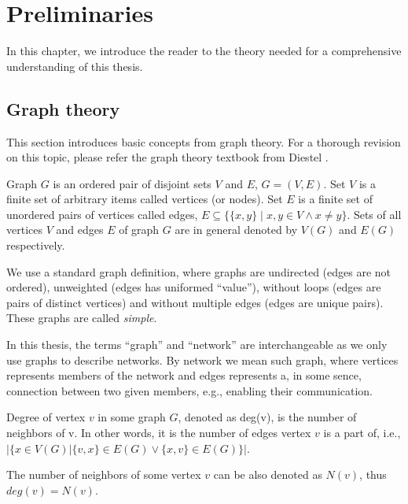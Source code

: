 \chapter{Preliminaries}

In this chapter, we introduce the reader to the theory needed for a comprehensive understanding of this thesis.


\section{Graph theory}

This section introduces basic concepts from graph theory.
For a thorough revision on this topic, please refer the graph theory textbook from Diestel \cite{Diestel2018}.

\begin{definition}[Graph]
    Graph $G$ is an ordered pair of disjoint sets $V$ and $E$, $G=(V,E)$.
    Set $V$ is a finite set of arbitrary items called vertices (or nodes).
    Set $E$ is a finite set of unordered pairs of vertices called edges, $E \subseteq \{\{x,y\} \mid x,y \in V \wedge x \neq y\}$.
    Sets of all vertices $V$ and edges $E$ of graph $G$ are in general denoted by $V(G)$ and $E(G)$ respectively.
\end{definition}
We use a standard graph definition, where graphs are undirected (edges are not ordered),
unweighted (edges has uniformed ``value''), without loops (edges are pairs of distinct vertices) and
without multiple edges (edges are unique pairs).
These graphs are called \emph{simple}.

In this thesis, the terms ``graph'' and ``network'' are interchangeable as we only use graphs to describe networks.
By network we mean such graph, where vertices represents members of the network 
and edges represents a, in some sence, connection between two given members, e.g., enabling their communication.

\begin{definition}
    Degree of vertex $v$ in some graph $G$, denoted as deg(v), is the number of neighbors of v.
    In other words, it is the number of edges vertex $v$ is a part of, i.e.,
    $\Big|\{x \in V(G) \vert \{v,x\} \in E(G) \vee \{x,v\} \in E(G)\}\Big|$.
\end{definition}
The number of neighbors of some vertex $v$ can be also denoted as $N(v)$, thus $deg(v) = N(v)$.

